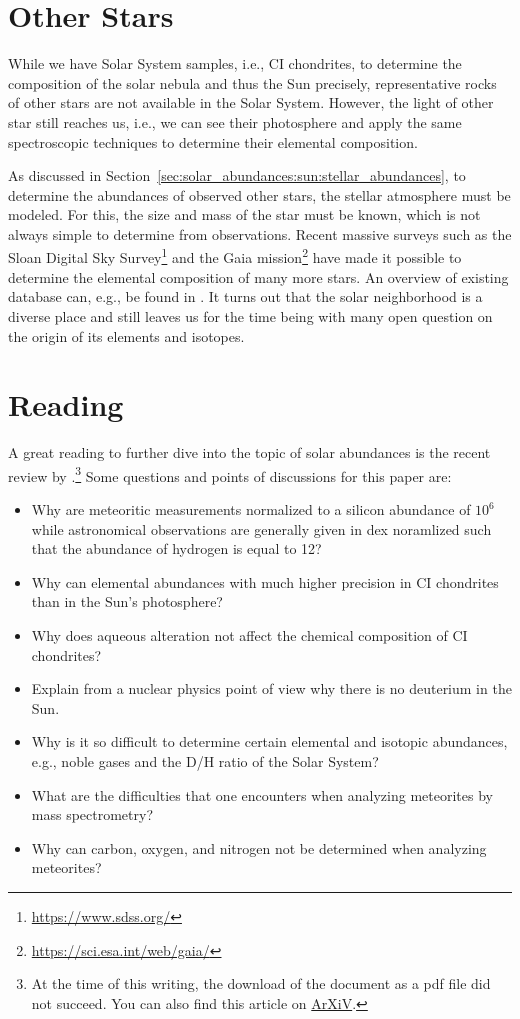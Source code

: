\section{Other Stars}

While we have Solar System samples, i.e., CI chondrites, to determine the composition of the solar nebula and thus the Sun precisely, representative rocks of other stars are not available in the Solar System. However, the light of other star still reaches us, i.e., we can see their photosphere and apply the same spectroscopic techniques to determine their elemental composition. 

As discussed in Section~\ref{sec:solar_abundances:sun:stellar_abundances}, to determine the abundances of observed other stars, the stellar atmosphere must be modeled. For this, the size and mass of the star must be known, which is not always simple to determine from observations. Recent massive surveys such as the Sloan Digital Sky Survey\footnote{\url{https://www.sdss.org/}} and the Gaia mission\footnote{\url{https://sci.esa.int/web/gaia/}} have made it possible to determine the elemental composition of many more stars. An overview of existing database can, e.g., be found in \citet{allende-prieto16}. It turns out that the solar neighborhood is a diverse place \citep[see, e.g.,][]{bensby14} and still leaves us for the time being with many open question on the origin of its elements and isotopes.

\section{Reading}

A great reading to further dive into the topic of solar abundances is the recent review by \citet{lodders20}.\footnote{At the time of this writing, the download of the document as a \ac{pdf} file did not succeed. You can also find this article on \href{https://arxiv.org/abs/1912.00844}{ArXiV}.} Some questions and points of discussions for this paper are:
\begin{itemize}
    \item Why are meteoritic measurements normalized to a silicon abundance of $10^6$ while astronomical observations are generally given in \ac{dex} noramlized such that the abundance of hydrogen is equal to 12?
    \item Why can elemental abundances with much higher precision in CI chondrites than in the Sun's photosphere?
    \item Why does aqueous alteration not affect the chemical composition of CI chondrites?
    \item Explain from a nuclear physics point of view why there is no deuterium in the Sun.
    \item Why is it so difficult to determine certain elemental and isotopic abundances, e.g., noble gases and the D/H ratio of the Solar System?
    \item What are the difficulties that one encounters when analyzing meteorites by mass spectrometry?
    \item Why can carbon, oxygen, and nitrogen not be determined when analyzing meteorites?
\end{itemize}